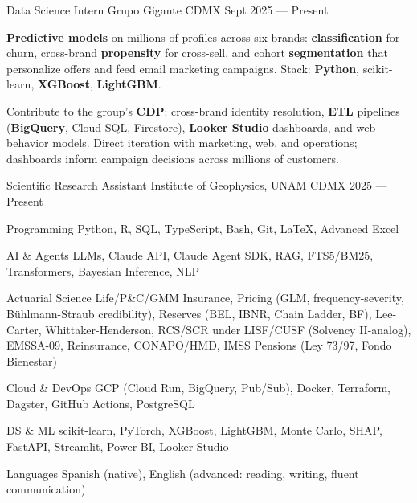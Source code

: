 \documentclass[10pt, letterpaper]{awesome-cv}
\begin{document}
\begin{cventries}

  \cventry
    {Data Science Intern}
    {Grupo Gigante}
    {CDMX}
    {Sept 2025 — Present}
    {
      \begin{cvitems}
        \item {\textbf{Predictive models} on millions of profiles across six brands: \textbf{classification} for churn, cross-brand \textbf{propensity} for cross-sell, and cohort \textbf{segmentation} that personalize offers and feed email marketing campaigns. Stack: \textbf{Python}, scikit-learn, \textbf{XGBoost}, \textbf{LightGBM}.}
        \item {Contribute to the group's \textbf{CDP}: cross-brand identity resolution, \textbf{ETL} pipelines (\textbf{BigQuery}, Cloud SQL, Firestore), \textbf{Looker Studio} dashboards, and web behavior models. Direct iteration with marketing, web, and operations; dashboards inform campaign decisions across millions of customers.}
      \end{cvitems}
    }

  \cventry
    {Scientific Research Assistant }
    {Institute of Geophysics, UNAM}
    {CDMX}
    {2025 — Present}
    {
      \begin{cvitems}
        \item {Co-author of a scientific paper on Popocatépetl eruption forecasting using Weibull renewal processes: statistical modeling of rare high-impact events. Advisor: 
      \end{cvitems}
    }

\end{cventries}


\begin{cvskills}
  \cvskill
    {Programming}
    {Python, R, SQL, TypeScript, Bash, Git, \LaTeX, Advanced Excel}

  \cvskill
    {AI \& Agents}
    {LLMs, Claude API, Claude Agent SDK, RAG, FTS5/BM25, Transformers, Bayesian Inference, NLP}

  \cvskill
    {Actuarial Science}
    {Life/P\&C/GMM Insurance, Pricing (GLM, frequency-severity, Bühlmann-Straub credibility), Reserves (BEL, IBNR, Chain Ladder, BF), Lee-Carter, Whittaker-Henderson, RCS/SCR under LISF/CUSF (Solvency II-analog), EMSSA-09, Reinsurance, CONAPO/HMD, IMSS Pensions (Ley 73/97, Fondo Bienestar)}

  \cvskill
    {Cloud \& DevOps}
    {GCP (Cloud Run, BigQuery, Pub/Sub), Docker, Terraform, Dagster, GitHub Actions, PostgreSQL}

  \cvskill
    {DS \& ML}
    {scikit-learn, PyTorch, XGBoost, LightGBM, Monte Carlo, SHAP, FastAPI, Streamlit, Power BI, Looker Studio}

  \cvskill
    {Languages}
    {Spanish (native), English (advanced: reading, writing, fluent communication)}
\end{cvskills}
\end{document}
